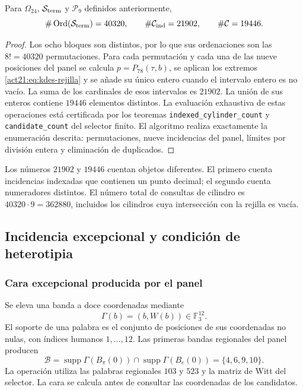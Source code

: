 \begin{proposition}
Para $\Omega_{24}$, $\mathcal S_{\rm term}$ y $\mathcal P_9$
definidos anteriormente,
\[
 \#\operatorname{Ord}(\mathcal S_{\rm term})=40320,
 \qquad\#\mathcal C_{\rm ind}=21902,
 \qquad\#\mathcal C=19446.
\]
\end{proposition}
\begin{proof}
Los ocho bloques son distintos, por lo que sus ordenaciones son las
$8!=40320$ permutaciones. Para cada permutación y cada una de las
nueve posiciones del panel se calcula $p=P_{78}(\tau,b)$, se aplican
los extremos \eqref{act21:eq:kdes-rejilla} y se añade su único entero cuando
el intervalo entero es no vacío. La suma de los cardinales de esos
intervalos es $21902$. La unión de sus enteros contiene $19446$
elementos distintos. La evaluación exhaustiva de estas operaciones
está certificada por los teoremas
\texttt{indexed\_cylinder\_count} y \texttt{candidate\_count} del
selector finito. El algoritmo realiza exactamente la enumeración
descrita: permutaciones, nueve incidencias del panel, límites por
división entera y eliminación de duplicados.
\end{proof}

Los números $21902$ y $19446$ cuentan objetos diferentes. El primero
cuenta incidencias indexadas que contienen un punto decimal; el segundo
cuenta numeradores distintos. El número total de consultas de cilindro
es $40320\cdot9=362880$, incluidos los cilindros cuya intersección con
la rejilla es vacía.

\subsection{Incidencia excepcional y condición de heterotipia}

\subsubsection{Cara excepcional producida por el panel}

Se eleva una banda a doce coordenadas mediante
\[
 \Gamma(b)=(b,W(b))\in\mathbb F_3^{12}.
\]
El soporte de una palabra es el conjunto de posiciones de sus
coordenadas no nulas, con índices humanos $1,\ldots,12$. Las primeras
bandas regionales del panel producen
\begin{equation}
 \mathcal B=\operatorname{supp}\Gamma(B_\pi(0))
          \cap\operatorname{supp}\Gamma(B_e(0))
          =\{4,6,9,10\}.
 \label{act21:eq:kdes-cara}
\end{equation}
La operación utiliza las palabras regionales $103$ y $523$ y la
matriz de Witt del selector. La cara se calcula antes de consultar las
coordenadas de los candidatos.

